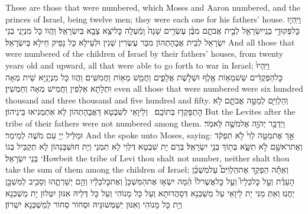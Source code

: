{These are those that were numbered, which Moses and Aaron numbered, and the princes of Israel, being twelve men; they were each one for his fathers’ house.}{}
{וַיִּֽהְי֛וּ כׇּל\maqqaf פְּקוּדֵ֥י בְנֵֽי\maqqaf יִשְׂרָאֵ֖ל לְבֵ֣ית אֲבֹתָ֑ם מִבֶּ֨ן עֶשְׂרִ֤ים שָׁנָה֙ וָמַ֔עְלָה כׇּל\maqqaf יֹצֵ֥א צָבָ֖א בְּיִשְׂרָאֵֽל׃}
{וַהֲווֹ כָּל מִנְיָנֵי בְנֵי יִשְׂרָאֵל לְבֵית אֲבָהָתְהוֹן מִבַּר עֶשְׂרִין שְׁנִין וּלְעֵילָא כָּל נָפֵיק חֵילָא בְּיִשְׂרָאֵל׃}
{And all those that were numbered of the children of Israel by their fathers’ houses, from twenty years old and upward, all that were able to go forth to war in Israel;}{}
{וַיִּֽהְיוּ֙ כׇּל\maqqaf הַפְּקֻדִ֔ים שֵׁשׁ\maqqaf מֵא֥וֹת אֶ֖לֶף וּשְׁלֹ֣שֶׁת אֲלָפִ֑ים וַחֲמֵ֥שׁ מֵא֖וֹת וַחֲמִשִּֽׁים׃}
{וַהֲווֹ כָּל מִנְיָנַיָּא שֵׁית מְאָה וּתְלָתָא אַלְפִין וַחֲמֵישׁ מְאָה וְחַמְשִׁין׃}
{even all those that were numbered were six hundred thousand and three thousand and five hundred and fifty.}{}
{וְהַלְוִיִּ֖ם לְמַטֵּ֣ה אֲבֹתָ֑ם לֹ֥א הׇתְפָּקְד֖וּ בְּתוֹכָֽם׃ \petucha }
{וְלֵיוָאֵי לְשִׁבְטָא דַּאֲבָהָתְהוֹן לָא אִתְמְנִיאוּ בֵּינֵיהוֹן׃}
{But the Levites after the tribe of their fathers were not numbered among them.}{}
{וַיְדַבֵּ֥ר יְהֹוָ֖ה אֶל\maqqaf מֹשֶׁ֥ה לֵּאמֹֽר׃}
{וּמַלֵּיל יְיָ עִם מֹשֶׁה לְמֵימַר׃}
{And the \lord\space spoke unto Moses, saying:}{}
{אַ֣ךְ אֶת\maqqaf מַטֵּ֤ה לֵוִי֙ לֹ֣א תִפְקֹ֔ד וְאֶת\maqqaf רֹאשָׁ֖ם לֹ֣א תִשָּׂ֑א בְּת֖וֹךְ בְּנֵ֥י יִשְׂרָאֵֽל׃}
{בְּרַם יָת שִׁבְטָא דְּלֵוִי לָא תִמְנֵי וְיָת חוּשְׁבָּנְהוֹן לָא תְקַבֵּיל בְּגוֹ בְּנֵי יִשְׂרָאֵל׃}
{‘Howbeit the tribe of Levi thou shalt not number, neither shalt thou take the sum of them among the children of Israel;}{}
{וְאַתָּ֡ה הַפְקֵ֣ד אֶת\maqqaf הַלְוִיִּם֩ עַל\maqqaf מִשְׁכַּ֨ן הָעֵדֻ֜ת וְעַ֣ל כׇּל\maqqaf כֵּלָיו֮ וְעַ֣ל כׇּל\maqqaf אֲשֶׁר\maqqaf לוֹ֒ הֵ֜מָּה יִשְׂא֤וּ אֶת\maqqaf הַמִּשְׁכָּן֙ וְאֶת\maqqaf כׇּל\maqqaf כֵּלָ֔יו וְהֵ֖ם יְשָׁרְתֻ֑הוּ וְסָבִ֥יב לַמִּשְׁכָּ֖ן יַחֲנֽוּ׃}
{וְאַתְּ מַנִּי יָת לֵיוָאֵי עַל מַשְׁכְּנָא דְּסָהֲדוּתָא וְעַל כָּל מָנוֹהִי וְעַל כָּל דְּלֵיהּ אִנּוּן יִטְּלוּן יָת מַשְׁכְּנָא וְיָת כָּל מָנוֹהִי וְאִנּוּן יְשַׁמְּשׁוּנֵּיהּ וּסְחוֹר סְחוֹר לְמַשְׁכְּנָא יִשְׁרוֹן׃}

